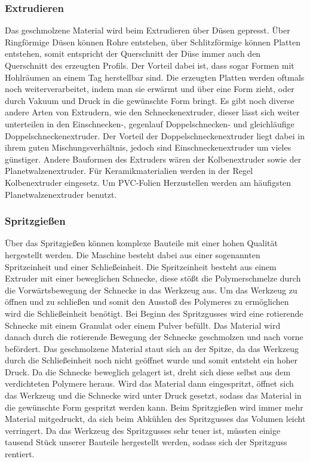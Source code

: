 \subsubsection{Extrudieren}
Das geschmolzene Material wird beim Extrudieren über Düsen gepresst. Über Ringförmige Düsen können Rohre entstehen,
über Schlitzförmige können Platten entstehen, somit entspricht der Querschnitt der Düse immer auch den Querschnitt
des erzeugten Profils. Der Vorteil dabei ist, dass sogar Formen mit Hohlräumen an einem Tag herstellbar sind.
Die erzeugten Platten werden oftmals noch weiterverarbeitet, indem man sie erwärmt und über eine Form zieht, oder durch
Vakuum und Druck in die gewünschte Form bringt.
Es gibt noch diverse andere Arten von Extrudern, wie den Schneckenextruder, dieser lässt sich weiter unterteilen in den
Einschnecken-, gegenlauf Doppelschnecken- und gleichläufige Doppelschneckenextruder. Der Vorteil der Doppelschneckenextruder
liegt dabei in ihrem guten Mischungsverhältnis, jedoch sind Einschneckenextruder um vieles günstiger.
Andere Bauformen des Extruders wären der Kolbenextruder sowie der Planetwalzenextruder.
Für Keramikmaterialien werden in der Regel Kolbenextruder eingesetz.
Um PVC-Folien Herzustellen werden am häufigsten Planetwalzenextruder benutzt.

\subsubsection{Spritzgießen}
Über das Spritzgießen können komplexe Bauteile mit einer hohen Qualität hergestellt werden. Die Maschine besteht dabei aus
einer sogenannten Spritzeinheit und einer Schließeinheit. Die Spritzeinheit besteht aus einem Extruder mit einer
beweglichen Schnecke, diese stößt die Polymerschmelze durch die Vorwärtsbewegung der Schnecke in das Werkzeug aus.
Um das Werkzeug zu öffnen und zu schließen und somit den Ausstoß des Polymeres zu ermöglichen wird die Schließeinheit
benötigt.
Bei Beginn des Spritzgusses wird eine rotierende Schnecke mit einem Granulat oder einem Pulver befüllt. Das Material
wird danach durch die rotierende Bewegung der Schnecke geschmolzen und nach vorne befördert. Das geschmolzene Material
staut sich an der Spitze, da das Werkzeug durch die Schließeinheit noch nicht geöffnet wurde und somit entsteht ein
hoher Druck. Da die Schnecke beweglich gelagert ist, dreht sich diese selbst aus dem verdichteten Polymere heraus.
Wird das Material dann eingespritzt, öffnet sich das Werkzeug und die Schnecke wird unter Druck gesetzt, sodass das
Material in die gewünschte Form gespritzt  werden kann.
Beim Spritzgießen wird immer mehr Material mitgedruckt, da sich beim Abkühlen des Spritzgusses das Volumen leicht
verringert.
Da das Werkzeug des Spritzgusses sehr teuer ist, müssten einige tausend Stück unserer Bauteile hergestellt werden,
sodass sich der Spritzguss rentiert.

